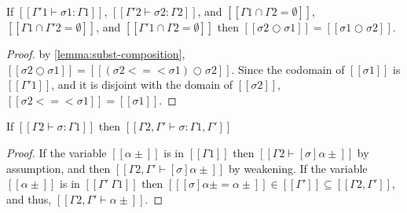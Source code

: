 \begin{corollary}
  \label{corollary:subst-composition-commutativity}
  If $[[Γ'1 ⊢ σ1 : Γ1]]$, $[[Γ'2 ⊢ σ2 : Γ2]]$, and
  $[[ Γ1 ∩ Γ2 = ∅ ]]$, 
  $[[ Γ1 ∩ Γ'2 = ∅ ]]$, and
  $[[ Γ'1 ∩ Γ2 = ∅ ]]$ then 
  $[[ σ2 ○ σ1 ]] = [[ σ1 ○ σ2 ]]$.
\end{corollary}
\begin{proof}
  by \cref{lemma:subst-composition},
    $[[ σ2 ○ σ1 ]] = [[ (σ2 <=< σ1) ○ σ2 ]]$.
    Since the codomain of $[[σ1]]$ is $[[Γ'1]]$,
    and it is disjoint with the domain of $[[σ2]]$,
    $[[σ2 <=< σ1]] = [[σ1]]$.
\end{proof}

\begin{lemma}
  \label{lemma:subst-domain-weakening}
  If $[[Γ2 ⊢ σ : Γ1]]$ then $[[Γ2, Γ' ⊢ σ : Γ1, Γ']]$
\end{lemma}
\begin{proof}
  If the variable $[[α±]]$ is in $[[Γ1]]$ then $[[Γ2 ⊢ [σ]α± ]]$ by assumption,
  and then $[[Γ2, Γ' ⊢ [σ]α± ]]$ by weakening.
  If the variable $[[α±]]$ is in $[[Γ' \ Γ1]]$ then $[[ [σ]α± = α± ]] \in [[Γ']] ⊆ [[Γ2, Γ']]$, 
  and thus, $[[Γ2, Γ' ⊢ α± ]]$.
\end{proof}

